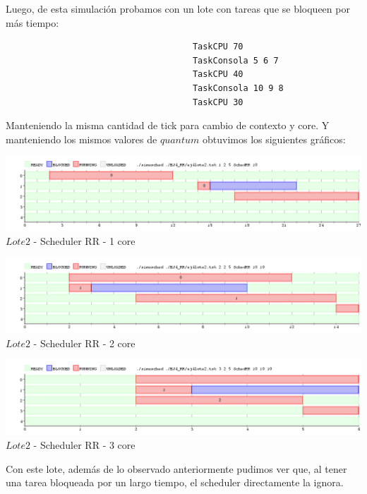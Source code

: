 \indent Luego, de esta simulación probamos con un lote con tareas que se bloqueen por más tiempo:
 \begin{verbatim}
                                     TaskCPU 70
                                     TaskConsola 5 6 7
                                     TaskCPU 40
                                     TaskConsola 10 9 8
                                     TaskCPU 30
 \end{verbatim}

\indent Manteniendo la misma cantidad de tick para cambio de contexto y core. Y manteniendo los mismos valores
de $quantum$ obtuvimos los siguientes gráficos:

\begin{center}
    	\includegraphics[width=450pt]{./EJ4_RR/ejercicio4-2lote1nucleo.png}
	{$Lote 2$ - Scheduler RR - 1 core}	
 \end{center}

 \begin{center}
    	\includegraphics[width=450pt]{./EJ4_RR/ejercicio4-2lote2nucleo.png}
	{$Lote 2$ - Scheduler RR - 2 core}	
 \end{center}
 
 \begin{center}
    	\includegraphics[width=450pt]{./EJ4_RR/ejercicio4-2lote3nucleo.png}
	{$Lote 2$ - Scheduler RR - 3 core}	
 \end{center}

 \indent Con este lote, además de lo observado anteriormente pudimos ver que, al tener una tarea bloqueada
 por un largo tiempo, el scheduler directamente la ignora.\\
 
